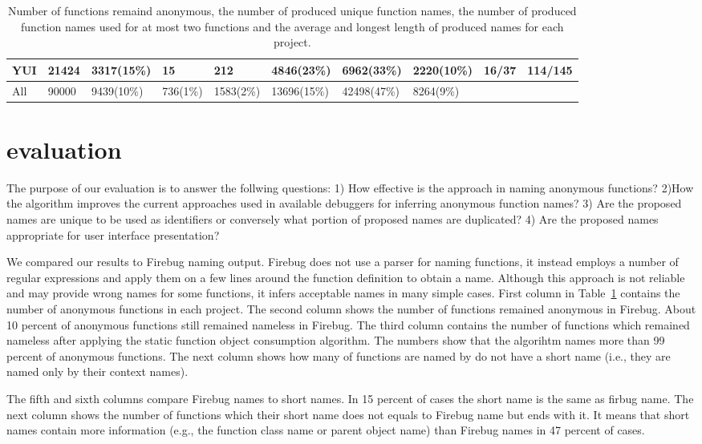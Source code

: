 \documentclass[10pt, preprint]{sigplanconf}
\begin{document}
{\begin{table}
{\begin{tabular}{ | l | l | l | l | l | l | l | l | l | l |}
  \hline    
   YUI           & 21424     &   3317(15\%)   & 15       &  212        &    4846(23\%)        &    6962(33\%)         & 2220(10\%)  & 16/37         & 114/145  \\ 
  \hline 
   All           & 90000     &   9439(10\%)   & 736(1\%) &  1583(2\%)  &    13696(15\%)       &    42498(47\%)        & 8264(9\%)   &                &          \\ 
  \hline       
  \end{tabular}
  }
 \label{evaluation} 
\caption{Number of functions remaind anonymous, the number of produced unique function names, the number of produced function names used for at most two functions and the average and longest length of produced names for each project.}
\end{table}    

\section{evaluation}
The purpose of our evaluation is to answer the follwing questions: 1) How effective is the approach in naming anonymous functions? 2)How the algorithm  improves the current approaches used in available debuggers for inferring anonymous function names? 3) Are the proposed names are unique to be used as identifiers or conversely what portion of proposed names are duplicated? 4) Are the proposed names appropriate for user interface presentation? 

We compared our results to Firebug naming output. Firebug does not use a parser for naming functions, it instead employs a number of regular expressions and apply them on a few lines around the function definition to obtain a name. Although this approach is not reliable and may provide wrong names for some functions, it infers acceptable names in many simple cases. First column in Table~\ref{evaluation} contains the number of anonymous functions in each project. The second column shows the number of functions remained anonymous in Firebug. About 10 percent of anonymous functions still remained nameless in Firebug. The third column contains the number of functions which remained nameless after applying the static function object consumption algorithm. The numbers show that the algorihtm names more than 99 percent of anonymous functions. The next column shows how many of functions are named by do not have a short name (i.e., they are named only by their context names).

The fifth and sixth columns compare Firebug names to short names. In 15 percent of cases the short name is the same as firbug name. The next column shows the number of functions which their short name does not equals to Firebug name but ends with it. It means that short names contain more information (e.g., the function class name or parent object name) than Firebug names in 47 percent of cases. 

}
\end{document}
